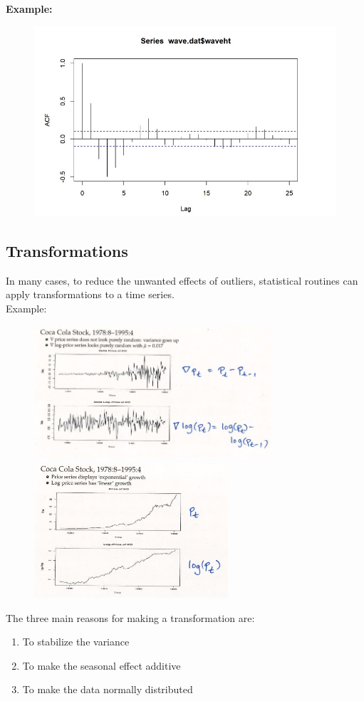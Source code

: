 \textbf{Example:}

\begin{figure}[H]
\includegraphics[scale=0.4]{images/Screenshot 2024-03-30 at 17.42.36.jpg}
\centering
\end{figure}


\subsection{Transformations}

In many cases, to reduce the unwanted effects of outliers, statistical routines can apply transformations to a time series.\\

Example:

\begin{figure}[H]
  \centering
  \begin{minipage}{0.49\textwidth}
    \includegraphics[height=5cm]{images/Screenshot 2024-03-30 at 17.45.04.jpg} %
  \end{minipage}\hfill
  \begin{minipage}{0.49\textwidth}
    \includegraphics[height=5cm]{images/Screenshot 2024-03-30 at 17.46.58.jpg} %
  \end{minipage}
\end{figure}

The three main reasons for making a transformation are:
\begin{enumerate}[label=(\roman*)]
    \item To stabilize the variance
    \item To make the seasonal effect additive
    \item To make the data normally distributed
\end{enumerate}

